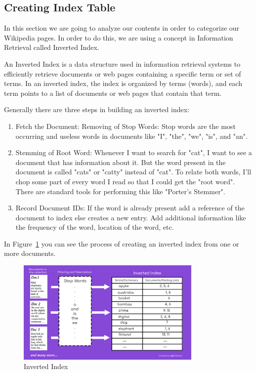 \documentclass{article}
\begin{document}
\subsection{Creating Index Table}
In this section we are going to analyze our contents in order to categorize our Wikipedia pages. In order to do this,
we are using a concept in Information Retrieval called Inverted Index.

An Inverted Index is a data structure used in information retrieval systems to efficiently retrieve documents or web pages
containing a specific term or set of terms.
In an inverted index, the index is organized by terms (words), and each term points to a list of documents or web pages that contain that term.

Generally there are three steps in building an inverted index:
\begin{enumerate}
    \item Fetch the Document: Removing of Stop Words: Stop words are the most occurring and useless words in documents like "I", "the", "we", "is", and "an".
    \item Stemming of Root Word: Whenever I want to search for "cat", I want to see a document that has information about it. But the word present in the document is called "cats" or "catty" instead of "cat". To relate both words, I'll chop some part of every word I read so that I could get the "root word". There are standard tools for performing this like "Porter's Stemmer".
    \item Record Document IDs: If the word is already present add a reference of the document to index else creates a new entry. Add additional information like the frequency of the word, location of the word, etc.
\end{enumerate}

In Figure~\ref{fig:invertindex} you can see the process of creating an inverted index from one or more documents.

\begin{figure}[h]
    \centering
    \includegraphics[width=0.8\textwidth]{./pics/invert-index.png}
    \caption{Inverted Index}
    \label{fig:invertindex}
\end{figure}
\end{document}
